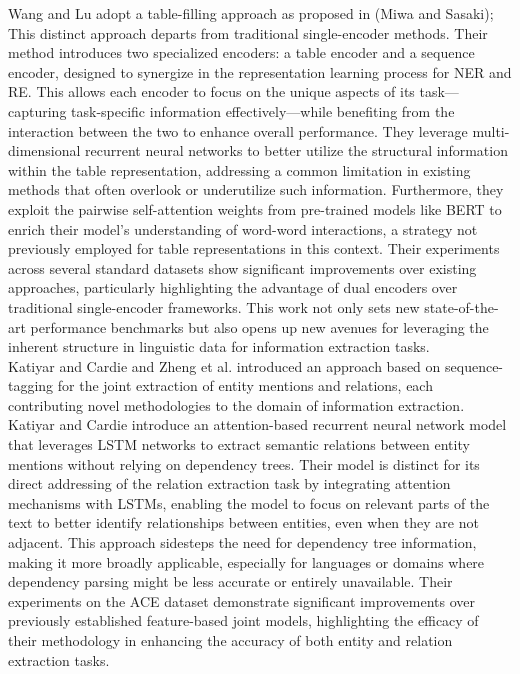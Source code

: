 Wang and Lu\cite{wang-lu-2020-two} adopt a table-filling approach as proposed in (Miwa and Sasaki\cite{miwa-sasaki-2014-modeling});
This distinct approach departs from traditional single-encoder methods. Their method introduces two specialized encoders: a table encoder and a sequence encoder, designed to synergize in the representation learning process for NER and RE. This allows each encoder to focus on the unique aspects of its task—capturing task-specific information effectively—while benefiting from the interaction between the two to enhance overall performance. They leverage multi-dimensional recurrent neural networks to better utilize the structural information within the table representation, addressing a common limitation in existing methods that often overlook or underutilize such information. Furthermore, they exploit the pairwise self-attention weights from pre-trained models like BERT\cite{devlin2019bert} to enrich their model's understanding of word-word interactions, a strategy not previously employed for table representations in this context. Their experiments across several standard datasets show significant improvements over existing approaches, particularly highlighting the advantage of dual encoders over traditional single-encoder frameworks. This work not only sets new state-of-the-art performance benchmarks but also opens up new avenues for leveraging the inherent structure in linguistic data for information extraction tasks.\\

Katiyar and Cardie\cite{katiyar-cardie-2017-going} and Zheng et al.\cite{zheng-etal-2017-joint} introduced an approach based on sequence-tagging for the joint extraction of entity mentions and relations, each contributing novel methodologies to the domain of information extraction. Katiyar and Cardie introduce an attention-based recurrent neural network model that leverages \ac{LSTM} networks to extract semantic relations between entity mentions without relying on dependency trees. Their model is distinct for its direct addressing of the relation extraction task by integrating attention mechanisms with LSTMs, enabling the model to focus on relevant parts of the text to better identify relationships between entities, even when they are not adjacent. This approach sidesteps the need for dependency tree information, making it more broadly applicable, especially for languages or domains where dependency parsing might be less accurate or entirely unavailable. Their experiments on the ACE dataset demonstrate significant improvements over previously established feature-based joint models, highlighting the efficacy of their methodology in enhancing the accuracy of both entity and relation extraction tasks.

